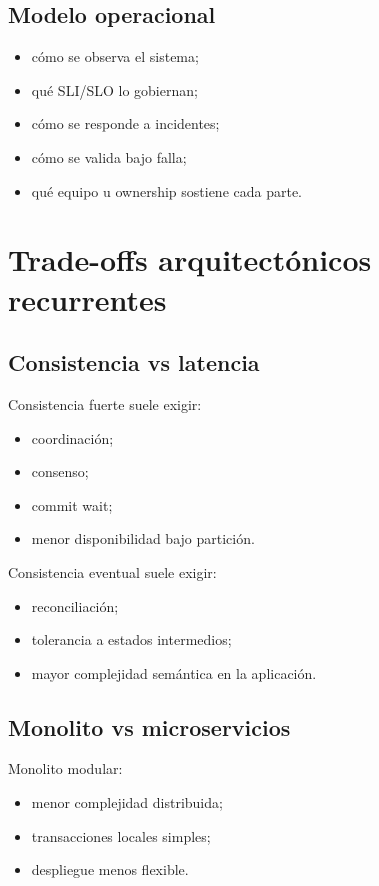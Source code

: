 \documentclass[variant=apuntes,cover=institutional,mode=screen]{ua-engineering-v6-article}
\begin{document}
\subsection{Modelo operacional}

\begin{itemize}
\item cómo se observa el sistema;
\item qué SLI/SLO lo gobiernan;
\item cómo se responde a incidentes;
\item cómo se valida bajo falla;
\item qué equipo u ownership sostiene cada parte.
\end{itemize}

\section{Trade-offs arquitectónicos recurrentes}

\subsection{Consistencia vs latencia}

Consistencia fuerte suele exigir:
\begin{itemize}
\item coordinación;
\item consenso;
\item commit wait;
\item menor disponibilidad bajo partición.
\end{itemize}

Consistencia eventual suele exigir:
\begin{itemize}
\item reconciliación;
\item tolerancia a estados intermedios;
\item mayor complejidad semántica en la aplicación.
\end{itemize}

\subsection{Monolito vs microservicios}

Monolito modular:
\begin{itemize}
\item menor complejidad distribuida;
\item transacciones locales simples;
\item despliegue menos flexible.
\end{itemize}
\end{document}
